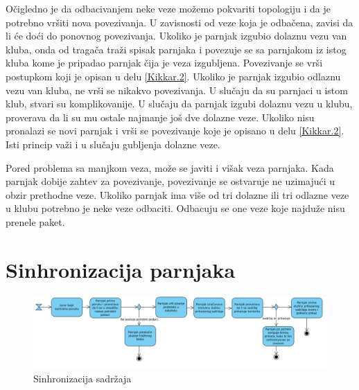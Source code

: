 \documentclass[12pt,oneside]{memoir}
\begin{document}
Očigledno je da odbacivanjem neke veze možemo pokvariti topologiju i da je potrebno vršiti nova povezivanja. U zavisnosti od veze koja je odbačena, zavisi da li će doći do ponovnog povezivanja. Ukoliko je parnjak izgubio dolaznu vezu van kluba, onda od tragača traži spisak parnjaka i povezuje se sa parnjakom iz istog kluba kome je pripadao parnjak čija je veza izgubljena. Povezivanje se vrši postupkom koji je opisan u delu \ref{Kikkar.2}. Ukoliko je parnjak izgubio odlaznu vezu van kluba, ne vrši se nikakvo povezivanja. U slučaju da su parnjaci u istom klub, stvari su komplikovanije. U slučaju da parnjak izgubi dolaznu vezu u klubu, proverava da li su mu ostale najmanje još dve dolazne veze. Ukoliko nisu pronalazi se novi parnjak i vrši se povezivanje koje je opisano u delu \ref{Kikkar.2}. Isti princip važi i u slučaju gubljenja dolazne veze.

Pored problema sa manjkom veza, može se javiti i višak veza parnjaka. Kada parnjak dobije zahtev za povezivanje, povezivanje se ostvaruje ne uzimajući u obzir prethodne veze. Ukoliko parnjak ima više od tri dolazne ili tri odlazne veze u klubu potrebno je neke veze odbaciti. Odbacuju se one veze koje najduže nisu prenele paket. 
  

\section{Sinhronizacija parnjaka}
\label{Kikkar.5}

\begin{figure}[!ht]
  \centering
  \includegraphics[width=1.05\textwidth]{slike/sinhronizacija.jpg}
  \caption{Sinhronizacija sadržaja}
  \label{fig:sinhronizacija}
\end{figure}
\par
\end{document}
